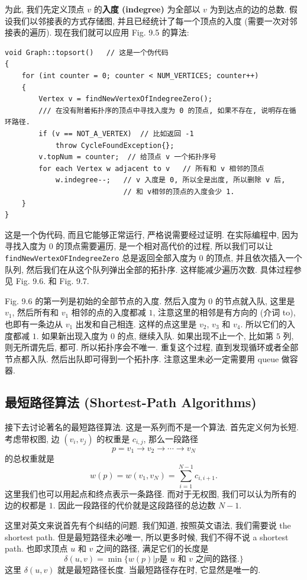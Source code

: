 \documentclass[a4paper]{ctexart}
\theoremstyle{definition}
\theoremstyle{definition}
\begin{document}
为此, 我们先定义顶点 $v$ 的{\bf 入度 (indegree)} 为全部以
$v$ 为到达点的边的总数. 假设我们以邻接表的方式存储图,
并且已经统计了每一个顶点的入度 (需要一次对邻接表的遍历).
现在我们就可以应用 Fig. 9.5 的算法:

\begin{verbatim}
void Graph::topsort()   // 这是一个伪代码
{
    for (int counter = 0; counter < NUM_VERTICES; counter++)
    {
        Vertex v = findNewVertexOfIndegreeZero();
        /// 在没有附着拓扑序的顶点中寻找入度为 0 的顶点, 如果不存在, 说明存在循环路径.
        if (v == NOT_A_VERTEX)  // 比如返回 -1
            throw CycleFoundException{};
        v.topNum = counter;  // 给顶点 v 一个拓扑序号
        for each Vertex w adjacent to v   // 所有和 v 相邻的顶点
            w.indegree--;   // v 入度是 0, 所以全是出度, 所以删除 v 后, 
                            // 和 v相邻的顶点的入度会少 1.
    }
}
\end{verbatim}

这是一个伪代码, 而且它能够正常运行, 严格说需要经过证明. 在实际编程中,
因为寻找入度为 0 的顶点需要遍历, 是一个相对高代价的过程,
所以我们可以让 \verb|findNewVertexOFIndegreeZero|
总是返回全部入度为 0 的顶点, 并且依次插入一个队列,
然后我们在从这个队列弹出全部的拓扑序.
这样能减少遍历次数. 具体过程参见 Fig. 9.6. 和 Fig. 9.7.

Fig. 9.6 的第一列是初始的全部节点的入度. 然后入度为 $0$ 的节点就入队,
这里是 $v_1$, 然后所有和 $v_1$ 相邻的点的入度都减 $1$, 注意这里的相邻是有方向的
(介词 to), 也即有一条边从 $v_1$ 出发和自己相连. 这样的点这里是 $v_2$, $v_3$ 和
$v_4$. 所以它们的入度都减 $1$. 如果新出现入度为 $0$ 的点, 继续入队. 如果出现不止一个,
比如第 $5$ 列, 则无所谓先后, 都可. 所以拓扑序会不唯一. 重复这个过程,
直到发现循环或者全部节点都入队. 然后出队即可得到一个拓扑序.
注意这里未必一定需要用 queue 做容器.

\subsection{最短路径算法 (Shortest-Path Algorithms)}
接下去讨论著名的最短路径算法. 这是一系列而不是一个算法.
首先定义何为长短. 考虑带权图, 边 $(v_i, v_j)$ 的权重是 $c_{i, j}$,
那么一段路径
$$
p = v_1 \to v_2 \to \cdots \to v_N
$$
的总权重就是
$$
w(p) = w(v_1, v_N) = \sum_{i = 1}^{N - 1}c_{i, i + 1}.
$$
这里我们也可以用起点和终点表示一条路径. 而对于无权图, 我们可以认为所有的边的权都是 $1$.
因此一段路径的代价就是这段路径的总边数 $N - 1$. 

 这里对英文来说首先有个纠结的问题. 我们知道,
按照英文语法, 我们需要说 the shortest path. 但是最短路径未必唯一, 所以更多时候,
我们不得不说 a shortest path. 也即求顶点 $u$ 和 $v$ 之间的路径, 满足它们的长度是
$$
\delta(u, v) = \min \{w(p) | p \mbox{是 $u$ 和 $v$ 之间的路径.}\}
$$
这里 $\delta(u, v)$ 就是最短路径长度. 当最短路径存在时, 它显然是唯一的.
\end{document}

